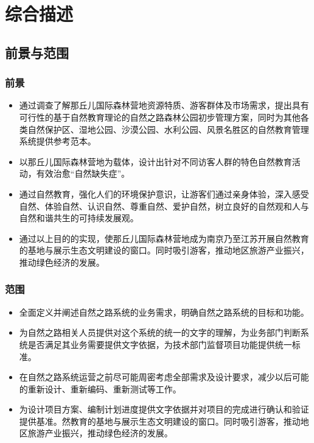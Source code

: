 \section{综合描述}

\subsection{前景与范围}
\subsubsection{前景}
\begin{itemize}
\item 通过调查了解那丘儿国际森林营地资源特质、游客群体及市场需求，提出具有可行性的基于自然教育理论的自然之路森林公园初步管理方案，同时为其他各类自然保护区、湿地公园、沙漠公园、水利公园、风景名胜区的自然教育管理系统提供参考范本。
\item 以那丘儿国际森林营地为载体，设计出针对不同访客人群的特色自然教育活动，有效治愈“自然缺失症”。
\item 通过自然教育，强化人们的环境保护意识，让游客们通过亲身体验，深入感受自然、体验自然、认识自然、尊重自然、爱护自然，树立良好的自然观和人与自然和谐共生的可持续发展观。
\item 通过以上目的的实现，使那丘儿国际森林营地成为南京乃至江苏开展自然教育的基地与展示生态文明建设的窗口。同时吸引游客，推动地区旅游产业振兴，推动绿色经济的发展。
\end{itemize}

\subsubsection{范围}
\begin{itemize}
\item 全面定义并阐述自然之路系统的业务需求，明确自然之路系统的目标和功能。
\item 为自然之路相关人员提供对这个系统的统一的文字的理解，为业务部门判断系统是否满足其业务需要提供文字依据，为技术部门监督项目功能提供统一标准。
\item 在自然之路系统运营之前尽可能周密考虑全部需求及设计要求，减少以后可能的重新设计、重新编码、重新测试等工作。
\item 为设计项目方案、编制计划进度提供文字依据并对项目的完成进行确认和验证提供基准。然教育的基地与展示生态文明建设的窗口。同时吸引游客，推动地区旅游产业振兴，推动绿色经济的发展。
\end{itemize}

